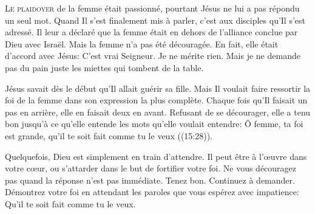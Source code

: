 



\lettrine{L}{e plaidoyer} de la femme était passionné,
 pourtant Jésus ne lui a pas répondu un seul mot.
 Quand Il s'est finalement mis à parler, c'est aux disciples
 qu'Il s'est adressé. Il leur a déclaré que la femme était en dehors
 de l'alliance conclue par Dieu avec Israël.
 Mais la femme n'a pas été découragée.
 En fait, elle était d'accord avec Jésus:
 \Og C'est vrai Seigneur. Je ne mérite rien.
 Mais je ne demande pas du pain
 \ocadr juste les miettes qui tombent de la table. \Fg{}


Jésus savait dès le début qu'Il allait guérir sa fille.
 Mais Il voulait faire ressortir la foi de la femme dans son expression
 la plus complète. Chaque fois qu'Il faisait un pas en arrière,
 elle en faisait deux en avant. Refusant de se décourager,
 elle a tenu bon jusqu'à ce qu'elle entende les mots
 qu'elle voulait entendre: 
 \Og Ô femme, ta foi est grande, qu'il te soit fait comme tu le veux \Fg{}
 ((15:28)). 

Quelquefois, Dieu est simplement en train d'attendre.
 Il peut être à l'\oe{}uvre dans votre c\oe{}ur, ou s'attarder dans le but
 de fortifier votre foi. Ne vous découragez pas quand la réponse
 n'est pas immédiate. Tenez bon. Continuez à demander.
 Démontrez votre foi en attendant
 les paroles que vous espérez
 avec impatience: 
 \Og Qu'il te soit fait comme tu le veux. \Fg{}

\dvrule




